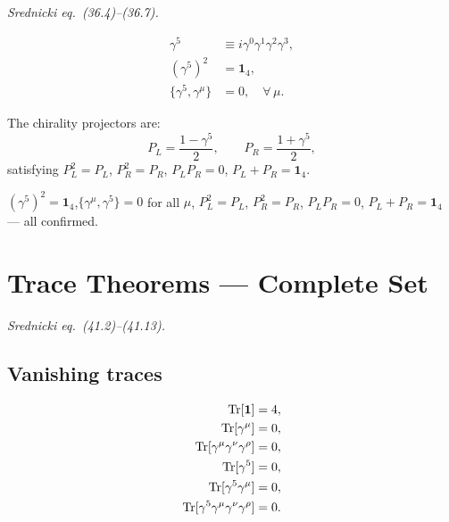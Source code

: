 \textit{Srednicki eq.\ (36.4)--(36.7).}

\begin{mdframed}[backgroundcolor=blue!5]
\begin{align}
  \gamma^5 &\equiv i\gamma^0\gamma^1\gamma^2\gamma^3,\label{eq:g5def}\\
  (\gamma^5)^2 &= \mathbf{1}_4,\label{eq:g5sq}\\
  \{\gamma^5,\gamma^\mu\} &= 0, \quad \forall\,\mu.\label{eq:g5anti}
\end{align}
\end{mdframed}

The chirality projectors are:
\begin{equation}
  P_L = \frac{1-\gamma^5}{2}, \qquad P_R = \frac{1+\gamma^5}{2},
\end{equation}
satisfying $P_L^2=P_L$, $P_R^2=P_R$, $P_LP_R=0$, $P_L+P_R=\mathbf{1}_4$.

\begin{mdframed}[backgroundcolor=green!5]
$(\gamma^5)^2 = \mathbf{1}_4$,\quad $\{\gamma^\mu,\gamma^5\}=0$ for all $\mu$,\quad
$P_L^2=P_L$, $P_R^2=P_R$, $P_LP_R=0$, $P_L+P_R=\mathbf{1}_4$ --- all confirmed.
\end{mdframed}

\section{Trace Theorems --- Complete Set}

\textit{Srednicki eq.\ (41.2)--(41.13).}

\subsection{Vanishing traces}

\begin{mdframed}[backgroundcolor=blue!5]
\begin{align}
  \operatorname{Tr}[\mathbf{1}] &= 4, \label{eq:tr1}\\
  \operatorname{Tr}[\gamma^\mu] &= 0, \label{eq:trgmu}\\
  \operatorname{Tr}[\gamma^\mu\gamma^\nu\gamma^\rho] &= 0, \label{eq:tr3}\\
  \operatorname{Tr}[\gamma^5] &= 0, \label{eq:trg5}\\
  \operatorname{Tr}[\gamma^5\gamma^\mu] &= 0, \label{eq:trg5gmu}\\
  \operatorname{Tr}[\gamma^5\gamma^\mu\gamma^\nu\gamma^\rho] &= 0. \label{eq:trg5odd}
\end{align}
\end{mdframed}


